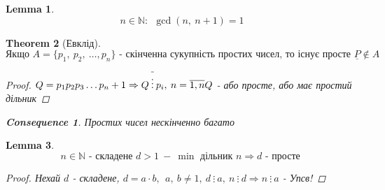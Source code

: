 \documentclass[a4paper,12pt]{bookest}
\newtheorem{theorem}{Theorem}[section]
\newtheorem{lemma}[theorem]{Lemma}
\newtheorem*{cons*}{Consequence}
\begin{document}
\begin{lemma}
	$$n\in\mathbb{N}:\>\>\gcd(n,\>n+1)=1$$
\end{lemma}
\begin{theorem}[Евклід]
	$$\textrm{Якщо }A=\{p_1,\>p_2,\>\dots,p_n\}\textrm{ - скінченна сукупність простих чисел, то існує просте } \underline{P}\notin A$$
	\begin{proof}
		$\\Q=p_1p_2p_3\dots p_n+1\Rightarrow Q\>\overline{\vdots }\>p_i,\>n=\overline{1,n}\\ Q$ - або просте, або має простий дільник
	\end{proof}
	\begin{cons*}
		$ $Простих чисел нескінченно багато
	\end{cons*}
\end{theorem}
\begin{lemma}
	$$n\in\mathbb{N} \textrm{ - складене } d>1\> -\>\min\textrm{ дільник } n\Rightarrow d\textrm{ - просте	}$$
	\begin{proof}
		$ $Нехай $d$ - складене, $d=a\cdot b,\>\>a,\>b\neq 1,\>d\>\vdots\>a,\>n\>\vdots\>d\Rightarrow n\>\vdots\>a$ - Упсв! 
	\end{proof}
\end{lemma}
\end{document}
